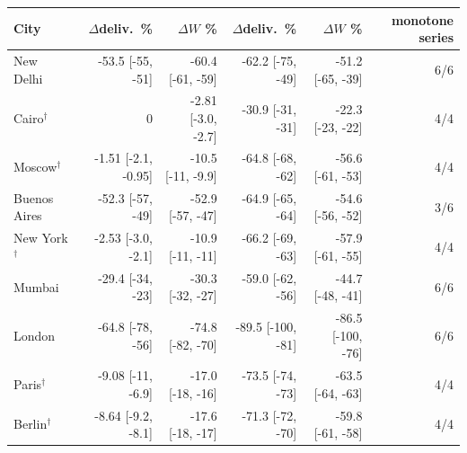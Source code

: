 \begin{tabular}{lrrrrr}
\toprule
City & $\Delta$deliv.\ \% & $\Delta W$ \% & $\Delta$deliv.\ \% & $\Delta W$ \% & monotone series \\
\midrule
New Delhi & -53.5 [-55, -51] & -60.4 [-61, -59] & -62.2 [-75, -49] & -51.2 [-65, -39] & 6/6 \\
Cairo$^\dagger$ & 0 & -2.81 [-3.0, -2.7] & -30.9 [-31, -31] & -22.3 [-23, -22] & 4/4 \\
Moscow$^\dagger$ & -1.51 [-2.1, -0.95] & -10.5 [-11, -9.9] & -64.8 [-68, -62] & -56.6 [-61, -53] & 4/4 \\
Buenos Aires & -52.3 [-57, -49] & -52.9 [-57, -47] & -64.9 [-65, -64] & -54.6 [-56, -52] & 3/6 \\
New York$^\dagger$ & -2.53 [-3.0, -2.1] & -10.9 [-11, -11] & -66.2 [-69, -63] & -57.9 [-61, -55] & 4/4 \\
Mumbai & -29.4 [-34, -23] & -30.3 [-32, -27] & -59.0 [-62, -56] & -44.7 [-48, -41] & 6/6 \\
London & -64.8 [-78, -56] & -74.8 [-82, -70] & -89.5 [-100, -81] & -86.5 [-100, -76] & 6/6 \\
Paris$^\dagger$ & -9.08 [-11, -6.9] & -17.0 [-18, -16] & -73.5 [-74, -73] & -63.5 [-64, -63] & 4/4 \\
Berlin$^\dagger$ & -8.64 [-9.2, -8.1] & -17.6 [-18, -17] & -71.3 [-72, -70] & -59.8 [-61, -58] & 4/4 \\
\bottomrule
\end{tabular}
